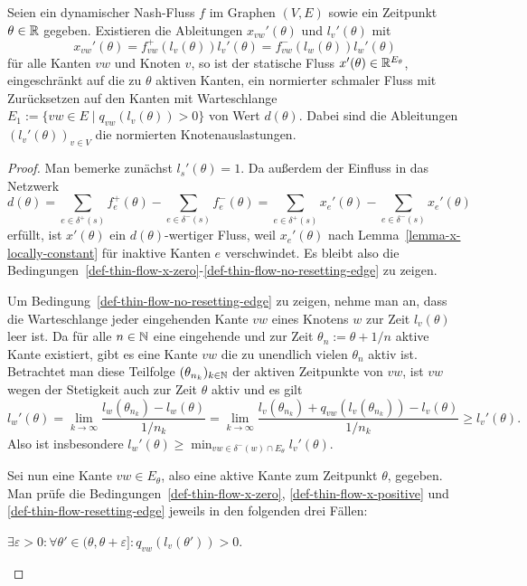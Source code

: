\begin{theorem}
	Seien ein dynamischer Nash-Fluss $f$ im Graphen $(V,E)$ sowie ein Zeitpunkt $\theta\in\mathbb{R}$ gegeben.
	Existieren die Ableitungen $x_{vw}'(\theta)$ und $l_v'(\theta)$ mit 
	\[
	x_{vw}'(\theta) = f_{vw}^+(l_v(\theta)) l_v'(\theta)= f_{vw}^-(l_w(\theta))l_w'(\theta)
	\]
	für alle Kanten $vw$ und Knoten $v$, so ist der statische Fluss $x'(\theta) \in \mathbb{R}^{E_\theta}$, eingeschränkt auf die zu $\theta$ aktiven Kanten, ein normierter schmaler Fluss mit Zurücksetzen auf den Kanten mit Warteschlange $E_1:=\{vw\in E \mid q_{vw}(l_v(\theta))>0 \}$ von Wert $d(\theta)$.
	Dabei sind die Ableitungen $(l_v'(\theta))_{v\in V}$ die normierten Knotenauslastungen.
\end{theorem}
\begin{proof}
	Man bemerke zunächst $l_s'(\theta) = 1$.
	Da außerdem der Einfluss in das Netzwerk 
	\[
	d(\theta)=  \sum_{e\in \delta^+(s)} f_e^+(\theta) - \sum_{e\in\delta^-(s)} f_e^-(\theta) = \sum_{e\in \delta^+(s)} x_e'(\theta) - \sum_{e\in\delta^-(s)} x_e'(\theta)
	\]
	erfüllt, ist $x'(\theta)$ ein $d(\theta)$-wertiger Fluss, weil $x_e'(\theta)$ nach Lemma~\ref{lemma-x-locally-constant} für inaktive Kanten $e$ verschwindet. Es bleibt also die Bedingungen~\ref{def-thin-flow-x-zero}-\ref{def-thin-flow-no-resetting-edge} zu zeigen.
	
	Um Bedingung~\ref{def-thin-flow-no-resetting-edge} zu zeigen,
	nehme man an, dass die Warteschlange jeder eingehenden Kante $vw$ eines Knotens $w$ zur Zeit $l_v(\theta)$ leer ist.
	Da für alle $n\in\mathbb{N}$ eine eingehende und zur Zeit $\theta_n := \theta + 1/n$ aktive Kante existiert, gibt es eine Kante $vw$ die zu unendlich vielen $\theta_n$ aktiv ist.
	Betrachtet man diese Teilfolge $(\theta_{n_k})_{k\in\mathbb{N}}$ der aktiven Zeitpunkte von $vw$, ist $vw$ wegen der Stetigkeit auch zur Zeit $\theta$ aktiv und es gilt 
	\[
	l_w'(\theta) = \lim_{k\to\infty} \frac{l_w(\theta_{n_k})- l_w(\theta)}{1/n_k} = \lim_{k\to\infty} \frac{ l_v(\theta_{n_k}) + q_{vw}(l_v(\theta_{n_k})) - l_v(\theta) }{1/n_k} \geq l_v'(\theta).
	\]
	Also ist insbesondere $l_w'(\theta) \geq \min_{vw\in \delta^-(w)\cap E_\theta} l_v'(\theta)$.
	
	Sei nun eine Kante $vw\in E_\theta$, also eine aktive Kante zum Zeitpunkt $\theta$, gegeben. Man prüfe die Bedingungen~\ref{def-thin-flow-x-zero}, \ref{def-thin-flow-x-positive} und \ref{def-thin-flow-resetting-edge} jeweils in den folgenden drei Fällen:
	
	\begin{description}[leftmargin=0cm, topsep=0cm, itemindent=0.5cm]
		\item[1. Fall:] $\exists \varepsilon > 0:\forall \theta'\in (\theta, \theta + \varepsilon ] : q_{vw}(l_v(\theta')) > 0$.
		

\end{description}
\end{proof}
